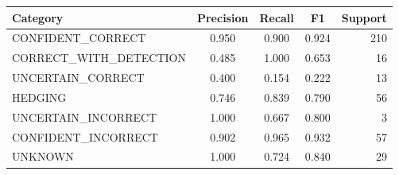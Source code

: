 \begin{tabular}{@{}lcccr@{}}
\toprule
\textbf{Category} & \textbf{Precision} & \textbf{Recall} & \textbf{F1} & \textbf{Support} \\
\midrule
CONFIDENT\_CORRECT & 0.950 & 0.900 & 0.924 & 210 \\
CORRECT\_WITH\_DETECTION & 0.485 & 1.000 & 0.653 & 16 \\
UNCERTAIN\_CORRECT & 0.400 & 0.154 & 0.222 & 13 \\
HEDGING & 0.746 & 0.839 & 0.790 & 56 \\
UNCERTAIN\_INCORRECT & 1.000 & 0.667 & 0.800 & 3 \\
CONFIDENT\_INCORRECT & 0.902 & 0.965 & 0.932 & 57 \\
UNKNOWN & 1.000 & 0.724 & 0.840 & 29 \\
\bottomrule
\end{tabular}